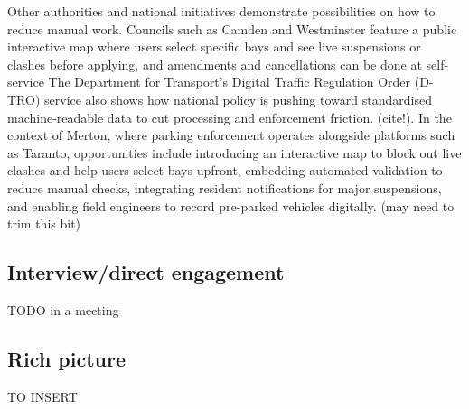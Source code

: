 Other authorities and national initiatives demonstrate possibilities on how to reduce manual work. Councils such as Camden and Westminster feature a public interactive map where users select specific bays and see live suspensions or clashes before applying, and amendments and cancellations can be done at self-service The Department for Transport’s Digital Traffic Regulation Order (D-TRO) service also shows how national policy is pushing toward standardised machine-readable data to cut processing and enforcement friction. (cite!). In the context of Merton, where parking enforcement operates alongside platforms such as Taranto, opportunities include introducing an interactive map to block out live clashes and help users select bays upfront, embedding automated validation to reduce manual checks, integrating resident notifications for major suspensions, and enabling field engineers to record pre-parked vehicles digitally. (may need to trim this bit)

\subsection{Interview/direct engagement}

TODO in a meeting

\subsection{Rich picture}

TO INSERT